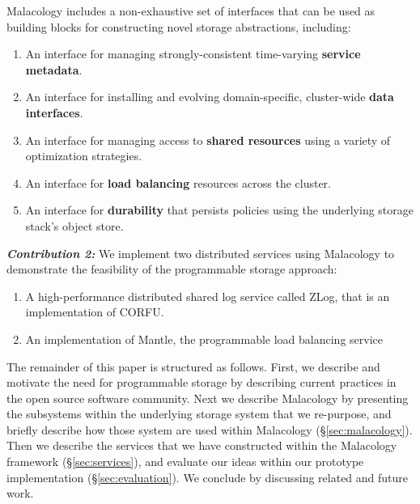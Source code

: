 Malacology includes a non-exhaustive set of interfaces that can be used as
building blocks for constructing novel storage abstractions, including:

\begin{enumerate}

\item An interface for managing strongly-consistent time-varying \textbf{service
metadata}.

\item An interface for installing and evolving domain-specific, cluster-wide
\textbf{data interfaces}.

\item An interface for managing access to \textbf{shared resources} using a
variety of optimization strategies.

\item An interface for \textbf{load balancing} resources across the cluster.

\item An interface for \textbf{durability} that persists policies using the
underlying storage stack's object store.

\end{enumerate}

{\it \textbf{Contribution 2:}} We implement two distributed services using
Malacology to demonstrate the feasibility of the programmable storage approach:

\begin{enumerate}

\item A high-performance distributed shared log service called ZLog, that is an
implementation of CORFU.~\cite{balakrishnan_corfu_2012}

\item An implementation of Mantle, the programmable load balancing
service~\cite{sevilla:sc15-mantle}

\end{enumerate}

The remainder of this paper is structured as follows. First, we describe and
motivate the need for programmable storage by describing current practices in
the open source software community. Next we describe Malacology by presenting
the subsystems within the underlying storage system that we re-purpose, and
briefly describe how those system are used within Malacology
(\S\ref{sec:malacology}).  Then we describe the services that we have
constructed within the Malacology framework (\S\ref{sec:services}), and
evaluate our ideas within our prototype implementation
(\S\ref{sec:evaluation}).  We conclude by discussing related and future work.
